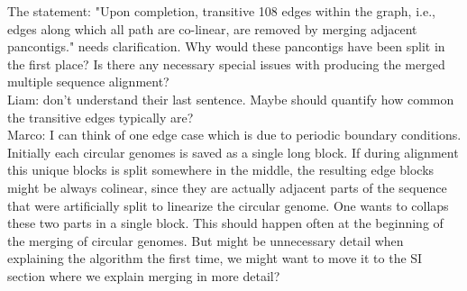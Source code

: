 \documentclass[aps,rmp,onecolumn]{revtex4-1}
\newcommand{\Marco}[1]{{\color{gray}Marco: #1}}
\newcommand{\Liam}[1]{{\color{teal}Liam: #1}}
\begin{document}
The statement: "Upon completion, transitive 108 edges within the graph, i.e., edges along which all path are co-linear, are removed by merging adjacent pancontigs." needs clarification. Why would these pancontigs have been split in the first place? Is there any necessary special issues with producing the merged multiple sequence alignment?\\
\Liam{don't understand their last sentence. Maybe should quantify how common the transitive edges typically are?}\\
\Marco{I can think of one edge case which is due to periodic boundary conditions. Initially each circular genomes is saved as a single long block. If during alignment this unique blocks is split somewhere in the middle, the resulting edge blocks might be always colinear, since they are actually adjacent parts of the sequence that were artificially split to linearize the circular genome. One wants to collaps these two parts in a single block. This should happen often at the beginning of the merging of circular genomes. But might be unnecessary detail when explaining the algorithm the first time, we might want to move it to the SI section where we explain merging in more detail?}\\
\end{document}

